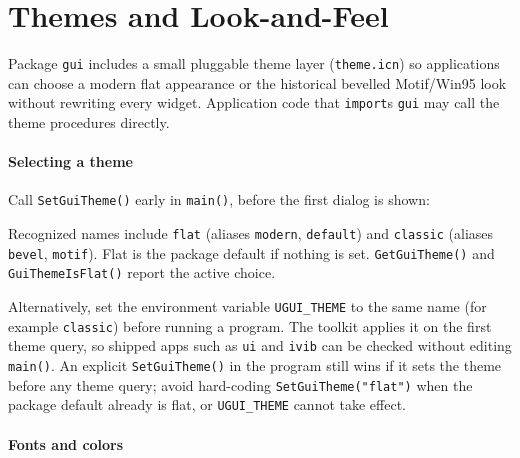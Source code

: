 \section{Themes and Look-and-Feel}

Package \texttt{gui} includes a small pluggable theme layer
(\texttt{theme.icn}) so applications can choose a modern flat
appearance or the historical bevelled Motif/Win95 look without
rewriting every widget. Application code that \texttt{import}s
\texttt{gui} may call the theme procedures directly.

\paragraph{Selecting a theme}

Call \texttt{SetGuiTheme()} early in \texttt{main()}, before the
first dialog is shown:


\noindent
Recognized names include \texttt{flat} (aliases \texttt{modern},
\texttt{default}) and \texttt{classic} (aliases \texttt{bevel},
\texttt{motif}). Flat is the package default if nothing is set.
\texttt{GetGuiTheme()} and \texttt{GuiThemeIsFlat()} report the
active choice.

Alternatively, set the environment variable \texttt{UGUI\_THEME} to the
same name (for example \texttt{classic}) before running a program.
The toolkit applies it on the first theme query, so shipped apps such
as \texttt{ui} and \texttt{ivib} can be checked without editing
\texttt{main()}. An explicit \texttt{SetGuiTheme()} in the program
still wins if it sets the theme before any theme query; avoid
hard-coding \texttt{SetGuiTheme("flat")} when the package default
already is flat, or \texttt{UGUI\_THEME} cannot take effect.

\paragraph{Fonts and colors}

